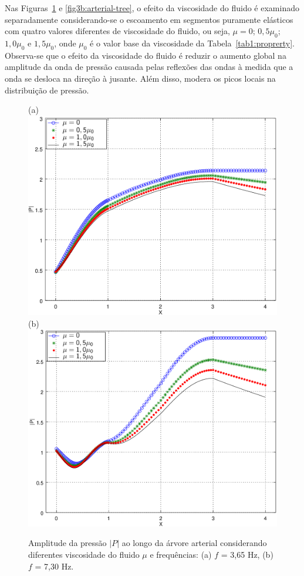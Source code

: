 Nas Figuras~\ref{fig3a:arterial-tree} e \ref{fig3b:arterial-tree}, o efeito da viscosidade do fluido é examinado separadamente conside\-ran\-do-se o escoamento em segmentos puramente elásticos com quatro valores diferentes de viscosidade do fluido, ou seja, $\mu = 0$; $0,5 \mu_0$; $1,0 \mu_0$ e $1,5 \mu_0$, onde $\mu_0$ é o valor base da viscosidade da Tabela~\ref{tab1:proprerty}. Observa-se que o efeito da viscosidade do fluido é reduzir o aumento global na amplitude da onda de pressão causada pelas reflexões das ondas à medida que a onda se desloca na direção à jusante. Além disso, modera os picos locais na distribuição de pressão.

\begin{figure}[!htbp]
	\centering
	(a) \\
	\includegraphics[scale=0.7]{Figures/fig3_P_f3_65_visc_NEW.png}\\
	(b)\\
	\includegraphics[scale=0.7]{Figures/fig3_P_f7_30_visc_NEW.png}\\
	\caption{Amplitude da pressão $|P|$ ao longo da árvore arterial considerando diferentes viscosidade do fluido $\mu$ e frequências: (a) $f$ = 3,65 Hz, (b)  $f$ = 7,30 Hz. }
	\label{fig3a:arterial-tree}%
\end{figure}


